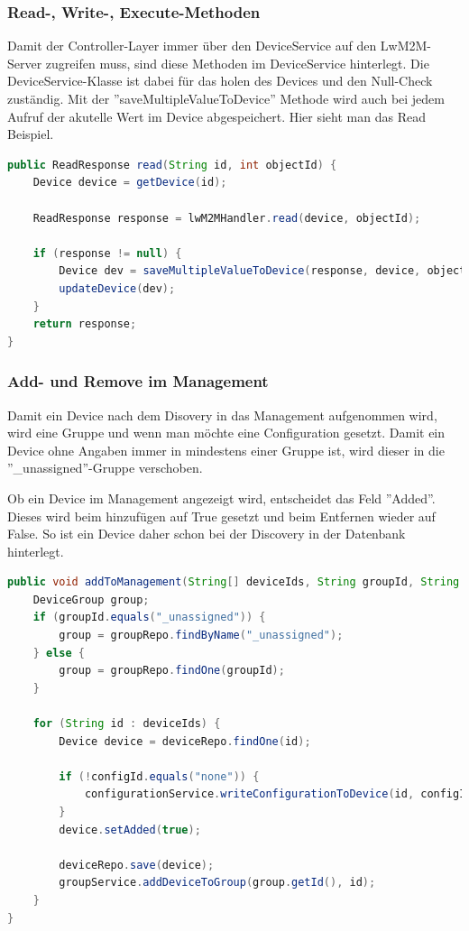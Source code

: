 \subsubsection{Read-, Write-, Execute-Methoden}
Damit der Controller-Layer immer über den DeviceService auf den LwM2M-Server zugreifen muss, sind diese Methoden im DeviceService hinterlegt. Die DeviceService-Klasse ist dabei für das holen des Devices und den Null-Check zuständig. Mit der ''saveMultipleValueToDevice'' Methode wird auch bei jedem Aufruf der akutelle Wert im Device abgespeichert. Hier sieht man das Read Beispiel.
\begin{lstlisting}[language=java]
public ReadResponse read(String id, int objectId) {
	Device device = getDevice(id);

	ReadResponse response = lwM2MHandler.read(device, objectId);

	if (response != null) {
		Device dev = saveMultipleValueToDevice(response, device, objectId);
		updateDevice(dev);
	}
	return response;
}
\end{lstlisting}

\subsubsection{Add- und Remove im Management}
Damit ein Device nach dem Disovery in das Management aufgenommen wird, wird eine Gruppe und wenn man möchte eine Configuration gesetzt. Damit ein Device ohne Angaben immer in mindestens einer Gruppe ist, wird dieser in die ''\_unassigned''-Gruppe verschoben. 

Ob ein Device im Management angezeigt wird, entscheidet das Feld ''Added''. Dieses wird beim hinzufügen auf True gesetzt und beim Entfernen wieder auf False. So ist ein Device daher schon bei der Discovery in der Datenbank hinterlegt.
\begin{lstlisting}[language=java]
public void addToManagement(String[] deviceIds, String groupId, String configId) {
	DeviceGroup group;
	if (groupId.equals("_unassigned")) {
		group = groupRepo.findByName("_unassigned");
	} else {
		group = groupRepo.findOne(groupId);
	}

	for (String id : deviceIds) {
		Device device = deviceRepo.findOne(id);

		if (!configId.equals("none")) {
			configurationService.writeConfigurationToDevice(id, configId);
		}
		device.setAdded(true);
	
		deviceRepo.save(device);
		groupService.addDeviceToGroup(group.getId(), id);
	}
}
\end{lstlisting}

